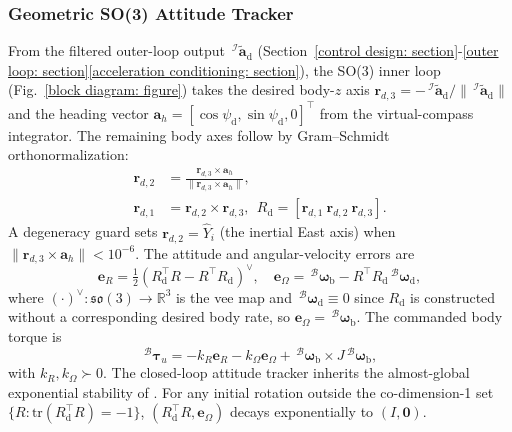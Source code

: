 
\subsubsection{Geometric SO(3) Attitude Tracker} \label{so3 inner loop: section}
From the filtered outer-loop output $\,^\mathcal{I}\tilde{\boldsymbol{a}}_\text{d}$ (Section~\ref{control design: section}-\ref{outer loop: section}\ref{acceleration conditioning: section}), the SO(3) inner loop (Fig.~\ref{block diagram: figure}) takes the desired body-$z$ axis $\boldsymbol{r}_{d,3}=-\,^\mathcal{I}\tilde{\boldsymbol{a}}_\text{d}/\|\,^\mathcal{I}\tilde{\boldsymbol{a}}_\text{d}\|$ and the heading vector $\boldsymbol{a}_h=[\cos\psi_\text{d},\sin\psi_\text{d},0]^\top$ from the virtual-compass integrator. The remaining body axes follow by Gram--Schmidt orthonormalization:
\begin{align} \label{R_d construction: equation}
    \boldsymbol{r}_{d,2} &= \frac{\boldsymbol{r}_{d,3}\times\boldsymbol{a}_h}{\|\boldsymbol{r}_{d,3}\times\boldsymbol{a}_h\|}, \nonumber\\
    \boldsymbol{r}_{d,1} &= \boldsymbol{r}_{d,2}\times\boldsymbol{r}_{d,3},\ \ R_\text{d}=[\boldsymbol{r}_{d,1}\ \boldsymbol{r}_{d,2}\ \boldsymbol{r}_{d,3}].
\end{align}
A degeneracy guard sets $\boldsymbol{r}_{d,2}=\hat{Y}_i$ (the inertial East axis) when $\|\boldsymbol{r}_{d,3}\times\boldsymbol{a}_h\|<10^{-6}$. The attitude and angular-velocity errors are
\begin{equation} \label{so3 errors: equation}
    \boldsymbol{e}_R = \tfrac12(R_\text{d}^\top R - R^\top R_\text{d})^\vee,\quad \boldsymbol{e}_\Omega = \,^\mathcal{B} \boldsymbol{\omega}_{\text{b}} - R^\top R_\text{d}\,^\mathcal{B}\boldsymbol{\omega}_\text{d},
\end{equation}
where $(\cdot)^\vee:\mathfrak{so}(3)\to\mathbb{R}^3$ is the vee map and $\,^\mathcal{B}\boldsymbol{\omega}_\text{d}\equiv 0$ since $R_\text{d}$ is constructed without a corresponding desired body rate, so $\boldsymbol{e}_\Omega=\,^\mathcal{B} \boldsymbol{\omega}_{\text{b}}$. The commanded body torque is
\begin{equation} \label{so3 torque: equation}
    \,^\mathcal{B}\boldsymbol{\tau}_u = -k_R\boldsymbol{e}_R - k_\Omega\boldsymbol{e}_\Omega + \,^\mathcal{B} \boldsymbol{\omega}_{\text{b}}\times J\,^\mathcal{B} \boldsymbol{\omega}_{\text{b}},
\end{equation}
with $k_R,k_\Omega\succ 0$. The closed-loop attitude tracker inherits the almost-global exponential stability of \cite[Thm.~3.1]{lee2010}. For any initial rotation outside the co-dimension-1 set $\{R:\text{tr}(R_\text{d}^\top R)=-1\}$, $(R_\text{d}^\top R,\boldsymbol{e}_\Omega)$ decays exponentially to $(I,\boldsymbol{0})$.

